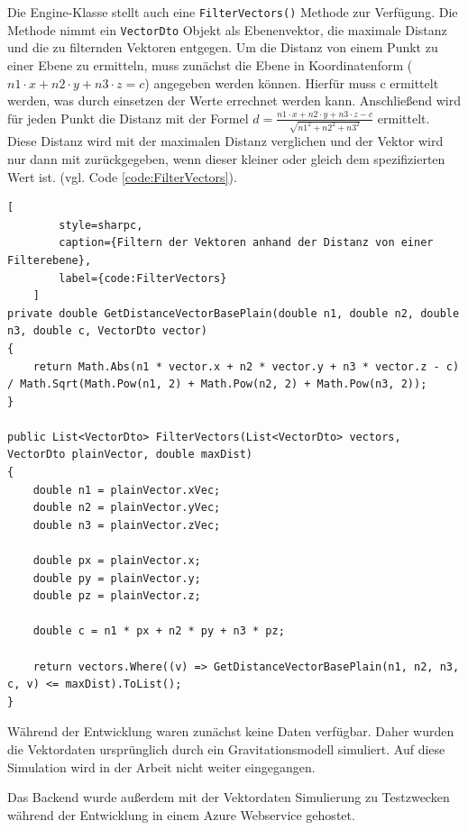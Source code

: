 Die Engine-Klasse stellt auch eine \texttt{FilterVectors()} Methode zur Verfügung.
Die Methode nimmt ein \texttt{VectorDto} Objekt als Ebenenvektor, die maximale Distanz
und die zu filternden Vektoren entgegen. Um die Distanz von einem Punkt
zu einer Ebene zu ermitteln, muss zunächst die Ebene in Koordinatenform
($n1 \cdot x + n2 \cdot y + n3 \cdot z = c$) angegeben werden können.
Hierfür muss c ermittelt werden, was durch einsetzen der Werte
errechnet werden kann. Anschließend wird für jeden Punkt die Distanz
mit der Formel $d = \frac{n1 \cdot x + n2 \cdot y + n3 \cdot z - c}{\sqrt{n1^2 + n2^2 + n3^2}}$ ermittelt.
Diese Distanz wird mit der maximalen Distanz verglichen und der Vektor
wird nur dann mit zurückgegeben, wenn dieser kleiner oder gleich dem spezifizierten Wert ist.
(vgl. Code \ref{code:FilterVectors}).

\begin{codeblock}
	\begin{lstlisting}[
		style=sharpc,
		caption={Filtern der Vektoren anhand der Distanz von einer Filterebene},
		label={code:FilterVectors}
	]
private double GetDistanceVectorBasePlain(double n1, double n2, double n3, double c, VectorDto vector)
{
	return Math.Abs(n1 * vector.x + n2 * vector.y + n3 * vector.z - c) / Math.Sqrt(Math.Pow(n1, 2) + Math.Pow(n2, 2) + Math.Pow(n3, 2));
}

public List<VectorDto> FilterVectors(List<VectorDto> vectors, VectorDto plainVector, double maxDist)
{
	double n1 = plainVector.xVec;
	double n2 = plainVector.yVec;
	double n3 = plainVector.zVec;

	double px = plainVector.x;
	double py = plainVector.y;
	double pz = plainVector.z;

	double c = n1 * px + n2 * py + n3 * pz;

	return vectors.Where((v) => GetDistanceVectorBasePlain(n1, n2, n3, c, v) <= maxDist).ToList();
}
	\end{lstlisting}
\end{codeblock}

Während der Entwicklung waren zunächst keine Daten verfügbar.
Daher wurden die Vektordaten ursprünglich durch ein Gravitationsmodell
simuliert. Auf diese Simulation wird in der Arbeit nicht weiter
eingegangen.

Das Backend wurde außerdem mit der Vektordaten Simulierung zu Testzwecken während
der Entwicklung in einem Azure Webservice gehostet.

